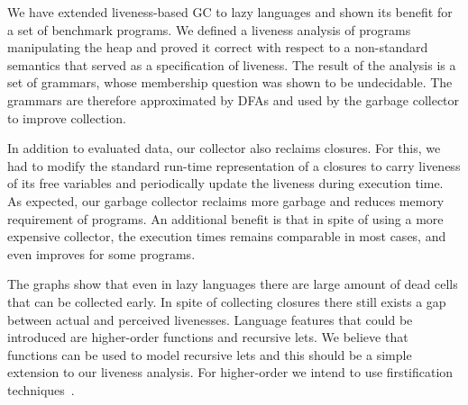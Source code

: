 \documentclass[9pt,preprint,nonatbib]{sigplanconf}
\begin{document}

We have  extended liveness-based  GC  to lazy
  languages  and shown  its benefit  for a  set of  benchmark
  programs.  We  defined a liveness analysis  of programs manipulating
  the  heap and  proved  it  correct with  respect  to a  non-standard
  semantics that served as a specification of liveness.  The result of
  the analysis  is a  set of grammars,  whose membership  question was
  shown to be undecidable. The  grammars are therefore approximated by
  DFAs and used by the garbage collector to improve collection.

In addition to  evaluated data, our collector  also reclaims closures.
For this, we  had to modify the standard run-time  representation of a
closures  to carry  liveness  of its free  variables and  periodically
update the liveness during execution  time.  As expected, our garbage
collector  reclaims more  garbage and  reduces memory  requirement of
programs.  An  additional benefit is  that in  spite of using  a more
expensive collector, the execution times remains comparable in
most cases, and even improves for some programs.


The graphs show that even in lazy languages there are large amount of
dead cells that can be collected early. In spite of collecting
closures there still exists a gap between actual and perceived
livenesses.  Language features that could be introduced are
higher-order functions and recursive lets. We believe that functions
can be used to model recursive lets and this should be a simple
extension to our liveness analysis.  For higher-order we intend to use
firstification techniques~\cite{Mitchell:2009}.
 
\end{document}
